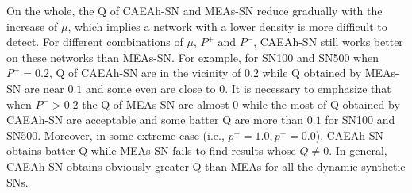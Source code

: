 \documentclass[10pt, journal]{IEEEtran}
\begin{document}
On the whole, the Q of CAEAh-SN and MEAs-SN reduce gradually with the increase of $\mu$, which implies a network with a lower density is more difficult to detect. For different combinations of $\mu$, $P^+$ and $P^-$, CAEAh-SN still works better on these networks than MEAs-SN. For example, for SN100 and SN500 when $P^-=0.2$, Q of CAEAh-SN are in the vicinity of $0.2$ while Q obtained by MEAs-SN are near $0.1$ and some even are close to $0$. It is necessary to emphasize that when $P^->0.2$ the Q of MEAs-SN are almost $0$ while the most of Q obtained by CAEAh-SN are acceptable and some batter Q are more than $0.1$ for SN100 and SN500. Moreover, in some extreme case (i.e., $p^+=1.0,p^-=0.0$), CAEAh-SN obtains batter Q while MEAs-SN fails to find results whose $Q\neq 0$. In general, CAEAh-SN obtains obviously greater Q than MEAs for all the dynamic synthetic SNs.
\end{document}
